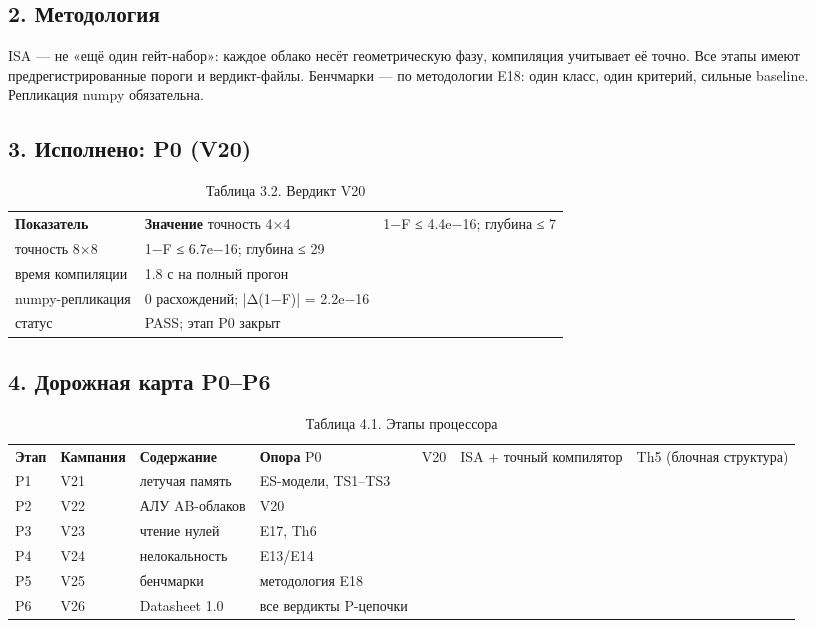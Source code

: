 \documentclass[11pt,a4paper]{article}
\begin{document}
\subsection{2. Методология}

ISA — не «ещё один гейт-набор»: каждое облако несёт геометрическую фазу, компиляция учитывает её точно. Все этапы имеют предрегистрированные пороги и вердикт-файлы. Бенчмарки — по методологии E18: один класс, один критерий, сильные baseline. Репликация numpy обязательна.

\subsection{3. Исполнено: P0 (V20)}

\begin{table}[htbp]\centering\small
\caption{Таблица 3.2. Вердикт V20}
\begin{tabular}{p{} p{}}
\toprule
\textbf{Показатель} & \textbf{Значение}
\midrule
точность 4×4 & 1−F ≤ 4.4e−16; глубина ≤ 7 \\
точность 8×8 & 1−F ≤ 6.7e−16; глубина ≤ 29 \\
время компиляции & 1.8 с на полный прогон \\
numpy-репликация & 0 расхождений; |Δ(1−F)| = 2.2e−16 \\
статус & PASS; этап P0 закрыт \\
\bottomrule
\end{tabular}
\end{table}

\subsection{4. Дорожная карта P0–P6}

\begin{table}[htbp]\centering\small
\caption{Таблица 4.1. Этапы процессора}
\begin{tabular}{p{} p{} p{} p{}}
\toprule
\textbf{Этап} & \textbf{Кампания} & \textbf{Содержание} & \textbf{Опора}
\midrule
P0 & V20 & ISA + точный компилятор & Th5 (блочная структура) \\
P1 & V21 & летучая память & ES-модели, TS1–TS3 \\
P2 & V22 & АЛУ AB-облаков & V20 \\
P3 & V23 & чтение нулей & E17, Th6 \\
P4 & V24 & нелокальность & E13/E14 \\
P5 & V25 & бенчмарки & методология E18 \\
P6 & V26 & Datasheet 1.0 & все вердикты P-цепочки \\
\bottomrule
\end{tabular}
\end{table}
\end{document}
